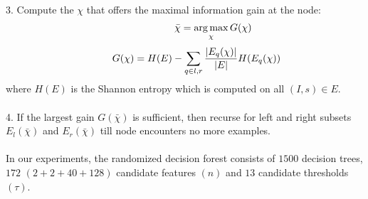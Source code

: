 \documentclass[twocolumn]{svjour3}          %
\begin{document}
3. Compute the $\chi$ that offers the maximal information gain at the node:
\begin{equation}
\hspace{20mm} \bar{\chi} = \operatorname*{arg\,max}_\chi G(\chi)
\end{equation}
\begin{equation}
\hspace{8mm} G(\chi) = H(E) - \sum_{q \in {l, r}}{\frac{|E_{q}(\chi)|}{|E|}H(E_{q}(\chi))}
\end{equation}
where $H(E)$ is the Shannon entropy which is computed on all $(I, s) \in E$.\\\vspace{-2.5mm}\\
4. If the largest gain $G(\bar{\chi})$ is sufficient, then recurse for left and right subsets $E_{l}(\bar{\chi})$ and $E_{r}(\bar{\chi})$ till node encounters no more examples.\\\vspace{-2.5mm}\\
In our experiments, the randomized decision forest consists of $1500$ decision trees, $172$ $(2+2+40+128)$ candidate features $(n)$ and $13$ candidate thresholds $(\tau)$.
\end{document}

